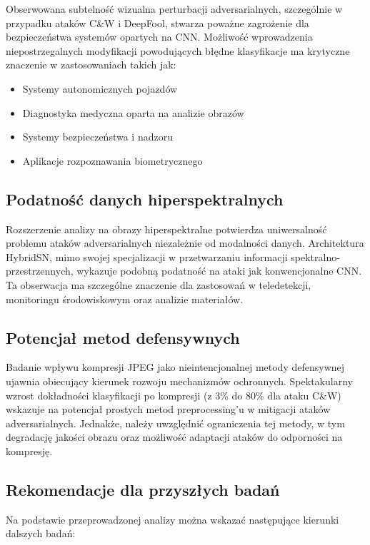 \documentclass[12pt]{article}
\begin{document}
Obserwowana subtelność wizualna perturbacji adversarialnych, szczególnie w przypadku ataków C\&W i DeepFool, stwarza poważne zagrożenie dla bezpieczeństwa systemów opartych na CNN. Możliwość wprowadzenia niepostrzegalnych modyfikacji powodujących błędne klasyfikacje ma krytyczne znaczenie w zastosowaniach takich jak:

\begin{itemize}
    \item Systemy autonomicznych pojazdów
    \item Diagnostyka medyczna oparta na analizie obrazów
    \item Systemy bezpieczeństwa i nadzoru
    \item Aplikacje rozpoznawania biometrycznego
\end{itemize}

\subsection{Podatność danych hiperspektralnych}

Rozszerzenie analizy na obrazy hiperspektralne potwierdza uniwersalność problemu ataków adversarialnych niezależnie od modalności danych. Architektura HybridSN, mimo swojej specjalizacji w przetwarzaniu informacji spektralno-przestrzennych, wykazuje podobną podatność na ataki jak konwencjonalne CNN. Ta obserwacja ma szczególne znaczenie dla zastosowań w teledetekcji, monitoringu środowiskowym oraz analizie materiałów.

\subsection{Potencjał metod defensywnych}

Badanie wpływu kompresji JPEG jako nieintencjonalnej metody defensywnej ujawnia obiecujący kierunek rozwoju mechanizmów ochronnych. Spektakularny wzrost dokładności klasyfikacji po kompresji (z 3\% do 80\% dla ataku C\&W) wskazuje na potencjał prostych metod preprocessing'u w mitigacji ataków adversarialnych. Jednakże, należy uwzględnić ograniczenia tej metody, w tym degradację jakości obrazu oraz możliwość adaptacji ataków do odporności na kompresję.

\subsection{Rekomendacje dla przyszłych badań}

Na podstawie przeprowadzonej analizy można wskazać następujące kierunki dalszych badań:
\end{document}
